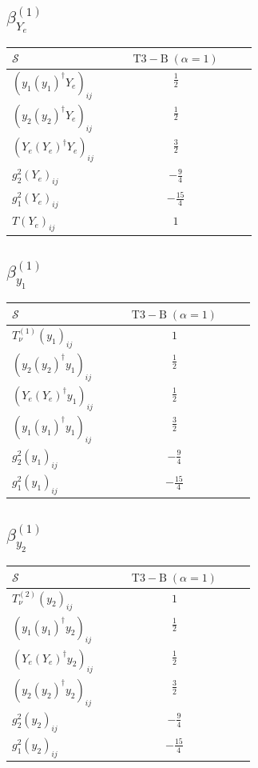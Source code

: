 \documentclass[9pt]{article}
\begin{document}
\subsection*{$ \beta_{Y_e}^{(1)} $}
\begin{longtable}{@{}p{0.38\linewidth}c@{}}
\toprule
$\mathcal{S}$ & $ \mathrm{T3-B}\;(\alpha=1) $ \\
\midrule
$ (y_1 (y_1)^{\dagger} Y_e)_{ij} $ & $ \frac{1}{2} $ \\
$ (y_2 (y_2)^{\dagger} Y_e)_{ij} $ & $ \frac{1}{2} $ \\
$ (Y_e (Y_e)^{\dagger} Y_e)_{ij} $ & $ \frac{3}{2} $ \\
$ g_2^2 (Y_e)_{ij} $ & $ - \frac{9}{4} $ \\
$ g_1^2 (Y_e)_{ij} $ & $ - \frac{15}{4} $ \\
$ T (Y_e)_{ij} $ & $ 1 $ \\
\bottomrule
\end{longtable}
\subsection*{$ \beta_{y_1}^{(1)} $}
\begin{longtable}{@{}p{0.38\linewidth}c@{}}
\toprule
$\mathcal{S}$ & $ \mathrm{T3-B}\;(\alpha=1) $ \\
\midrule
$ T_{\nu}^{(1)} (y_1)_{ij} $ & $ 1 $ \\
$ (y_2 (y_2)^{\dagger} y_1)_{ij} $ & $ \frac{1}{2} $ \\
$ (Y_e (Y_e)^{\dagger} y_1)_{ij} $ & $ \frac{1}{2} $ \\
$ (y_1 (y_1)^{\dagger} y_1)_{ij} $ & $ \frac{3}{2} $ \\
$ g_2^2 (y_1)_{ij} $ & $ - \frac{9}{4} $ \\
$ g_1^2 (y_1)_{ij} $ & $ - \frac{15}{4} $ \\
\bottomrule
\end{longtable}
\subsection*{$ \beta_{y_2}^{(1)} $}
\begin{longtable}{@{}p{0.38\linewidth}c@{}}
\toprule
$\mathcal{S}$ & $ \mathrm{T3-B}\;(\alpha=1) $ \\
\midrule
$ T_{\nu}^{(2)} (y_2)_{ij} $ & $ 1 $ \\
$ (y_1 (y_1)^{\dagger} y_2)_{ij} $ & $ \frac{1}{2} $ \\
$ (Y_e (Y_e)^{\dagger} y_2)_{ij} $ & $ \frac{1}{2} $ \\
$ (y_2 (y_2)^{\dagger} y_2)_{ij} $ & $ \frac{3}{2} $ \\
$ g_2^2 (y_2)_{ij} $ & $ - \frac{9}{4} $ \\
$ g_1^2 (y_2)_{ij} $ & $ - \frac{15}{4} $ \\
\bottomrule
\end{longtable}
\end{document}
